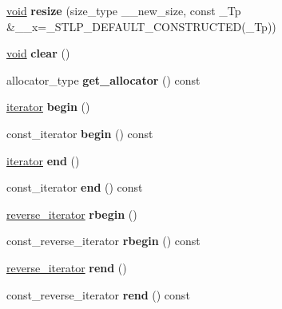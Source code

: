 \begin{DoxyCompactItemize}
\mbox{\label{structvector_a5da11b8021d3ced3dcbef3f4252f4b18}} 
\hyperlink{interfacevoid}{void} {\bfseries resize} (size\+\_\+type \+\_\+\+\_\+new\+\_\+size, const \+\_\+\+Tp \&\+\_\+\+\_\+x=\+\_\+\+S\+T\+L\+P\+\_\+\+D\+E\+F\+A\+U\+L\+T\+\_\+\+C\+O\+N\+S\+T\+R\+U\+C\+T\+ED(\+\_\+\+Tp))
\item 
\mbox{\label{structvector_ac981f7afffb33e12f772f98a23919a04}} 
\hyperlink{interfacevoid}{void} {\bfseries clear} ()
\item 
\mbox{\label{structvector_aa3f9918713c619780bf637900265b63c}} 
allocator\+\_\+type {\bfseries get\+\_\+allocator} () const
\item 
\mbox{\label{structvector_a91331710902de21946f9f22c4b027f2b}} 
\hyperlink{structiterator}{iterator} {\bfseries begin} ()
\item 
\mbox{\label{structvector_a13640884d2e3cdcad88857c551de34b0}} 
const\+\_\+iterator {\bfseries begin} () const
\item 
\mbox{\label{structvector_a0ed3ad42be9f6d5793dcaa5307e7d2e4}} 
\hyperlink{structiterator}{iterator} {\bfseries end} ()
\item 
\mbox{\label{structvector_a1fa209a2ebabb1df947fcd4adde9783f}} 
const\+\_\+iterator {\bfseries end} () const
\item 
\mbox{\label{structvector_a3ee188b5bf6c595bc18f8a0123d48f56}} 
\hyperlink{classreverse__iterator}{reverse\+\_\+iterator} {\bfseries rbegin} ()
\item 
\mbox{\label{structvector_a9f4fbafdb86447543b9b792d6be451c7}} 
const\+\_\+reverse\+\_\+iterator {\bfseries rbegin} () const
\item 
\mbox{\label{structvector_aab8dc03aa6d6888f249e8475578892dd}} 
\hyperlink{classreverse__iterator}{reverse\+\_\+iterator} {\bfseries rend} ()
\item 
\mbox{\label{structvector_a8a35a4bf7f3200747702d1188ba25afb}} 
const\+\_\+reverse\+\_\+iterator {\bfseries rend} () const

\end{DoxyCompactItemize}
